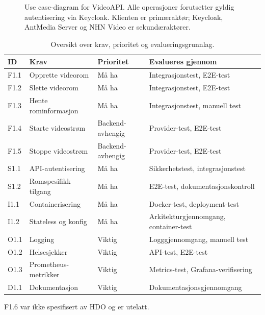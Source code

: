 \begin{figure}[htbp]
\begin{tikzpicture}[
    uc/.style={ellipse, draw=black, line width=0.4pt, align=center,
               font=\footnotesize, minimum width=5cm, minimum height=1.2cm},
    ln/.style={-, line width=0.4pt}
]
\end{tikzpicture}
\caption{Use case-diagram for VideoAPI. Alle operasjoner forutsetter gyldig autentisering via Keycloak. Klienten er primæraktør; Keycloak, AntMedia Server og NHN Video er sekundæraktører.}
\label{fig:usecase}
\end{figure}

\begin{table}[h]
\centering
\begin{threeparttable}
\caption{Oversikt over krav, prioritet og evalueringsgrunnlag.}
\label{tab:krav-oversikt}
\begin{tabular}{l l l l}
\toprule
\textbf{ID} & \textbf{Krav} & \textbf{Prioritet} & \textbf{Evalueres gjennom} \\
\midrule
F1.1 & Opprette videorom & Må ha & Integrasjonstest, E2E-test \\
F1.2 & Slette videorom & Må ha & Integrasjonstest, E2E-test \\
F1.3 & Hente rominformasjon & Må ha & Integrasjonstest, manuell test \\
F1.4 & Starte videostrøm & Backend-avhengig & Provider-test, E2E-test \\
F1.5 & Stoppe videostrøm & Backend-avhengig & Provider-test, E2E-test \\
S1.1 & API-autentisering & Må ha & Sikkerhetstest, integrasjonstest \\
S1.2 & Romspesifikk tilgang & Må ha & E2E-test, dokumentasjonskontroll \\
I1.1 & Containerisering & Må ha & Docker-test, deployment-test \\
I1.2 & Stateless og konfig & Må ha & Arkitekturgjennomgang, container-test \\
O1.1 & Logging & Viktig & Logggjennomgang, manuell test \\
O1.2 & Helsesjekker & Viktig & API-test, E2E-test \\
O1.3 & Prometheus-metrikker & Viktig & Metrics-test, Grafana-verifisering \\
D1.1 & Dokumentasjon & Viktig & Dokumentasjonsgjennomgang \\
\bottomrule
\end{tabular}
\begin{tablenotes}
\footnotesize
\item F1.6 var ikke spesifisert av HDO og er utelatt.
\end{tablenotes}
\end{threeparttable}
\end{table}
\newpage
